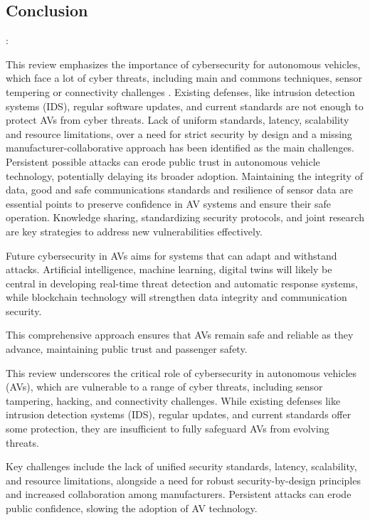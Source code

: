 \subsection{Conclusion}\label{subsec:conclusion}:

This review emphasizes the importance of cybersecurity for autonomous vehicles, which face a lot of cyber threats, including main and commons techniques, sensor tempering or connectivity challenges .
Existing defenses, like intrusion detection systems (IDS), regular software updates, and current standards are not enough to protect AVs from cyber threats.
Lack of uniform standards, latency, scalability and resource limitations, over a need for strict security by design and a missing manufacturer-collaborative approach has been identified as the main challenges.
Persistent possible attacks can erode public trust in autonomous vehicle technology, potentially delaying its broader adoption.
Maintaining the integrity of data, good and safe communications standards and resilience of sensor data are essential points to preserve confidence in AV systems and ensure their safe operation.
Knowledge sharing, standardizing security protocols, and joint research are key strategies to address new vulnerabilities effectively.

Future cybersecurity in AVs aims for systems that can adapt and withstand attacks.
Artificial intelligence, machine learning, digital twins will likely be central in developing real-time threat detection and automatic response systems, while blockchain technology will strengthen data integrity and communication security.

This comprehensive approach ensures that AVs remain safe and reliable as they advance, maintaining public trust and passenger safety.


This review underscores the critical role of cybersecurity in autonomous vehicles (AVs), which are vulnerable to a range of cyber threats, including sensor tampering, hacking, and connectivity challenges.
While existing defenses like intrusion detection systems (IDS), regular updates, and current standards offer some protection, they are insufficient to fully safeguard AVs from evolving threats.

Key challenges include the lack of unified security standards, latency, scalability, and resource limitations, alongside a need for robust security-by-design principles and increased collaboration among manufacturers.
Persistent attacks can erode public confidence, slowing the adoption of AV technology.

